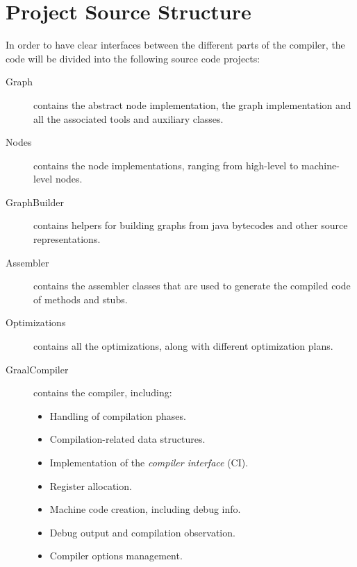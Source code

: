 
\section{Project Source Structure}
In order to have clear interfaces between the different parts of the compiler, the code will be divided into the following source code projects:
\begin{description}
    \item[Graph] contains the abstract node implementation, the graph implementation and all the associated tools and auxiliary classes.
    \item[Nodes] contains the node implementations, ranging from high-level to machine-level nodes.
    \item[GraphBuilder] contains helpers for building graphs from java bytecodes and other source representations.
    \item[Assembler] contains the assembler classes that are used to generate the compiled code of methods and stubs.
    \item[Optimizations] contains all the optimizations, along with different optimization plans.
    \item[GraalCompiler] contains the compiler, including:
        \begin{itemize}
            \item Handling of compilation phases.
            \item Compilation-related data structures.
            \item Implementation of the \emph{compiler interface} (CI).
            \item Register allocation.
            \item Machine code creation, including debug info.
            \item Debug output and compilation observation.
            \item Compiler options management.
        \end{itemize}
\end{description}

